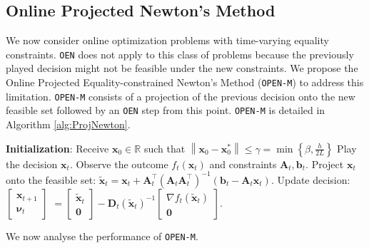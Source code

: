 \documentclass[journal,twoside,web]{ieeecolor}
\newcommand{\norm}[1]{\left\lVert#1\right\rVert}
\newcommand{\xx}{\mathbf{x}}
\newcommand{\bb}{\mathbf{b}}
\renewcommand{\AA}{\mathbf{A}}
\newcommand{\vv}{\bm{\nu}}
\newcommand{\yy}{\mathbf{y}}
\newcommand{\DD}{\mathbf{D}}
\begin{document}
\subsection{Online Projected Newton's Method}
We now consider online optimization problems with time-varying equality constraints. \texttt{OEN} does not apply to this class of problems because the previously played decision might not be feasible under the new constraints. We propose the Online Projected Equality-constrained Newton's Method (\texttt{OPEN-M}) to address this limitation. \texttt{OPEN-M} consists of a projection of the previous decision onto the new feasible set followed by an \texttt{OEN} step from this point. \texttt{OPEN-M} is detailed in Algorithm \ref{alg:ProjNewton}.
\begin{algorithm}
\caption{Online Projected Eq.-const. Newton Method}\label{alg:ProjNewton}
\begin{algorithmic}
\State\textbf{Initialization}: Receive $\xx_0 \in\mathbb{R}$ such that $\norm{\xx_0-\xx_0^*}\le\gamma=\min\left\{\beta,\frac{h}{2L}\right\}$
\State Play the decision $\xx_t.$
\State Observe the outcome $f_t(\xx_t)$ and constraints $\AA_t, \bb_t$.
\State Project $\xx_t$ onto the feasible set: 
\State $\tilde{\xx}_t = \xx_t+\AA_t^\top(\AA_t\AA_t^\top)^{-1}(\bb_t-\AA_t\xx_t).$
\State Update decision:
\State   $\begin{bmatrix}\xx_{t+1}\\ \vv_t\end{bmatrix}$ $=\begin{bmatrix}\tilde{\xx}_{t}\\ \mathbf{0}\end{bmatrix}-\DD_t(\tilde{\xx}_t)^{-1}\begin{bmatrix}\nabla f_t(\tilde{\xx}_t)\\\mathbf{0}\end{bmatrix}.$
\ENDFOR
\end{algorithmic}
\end{algorithm}
We now analyse the performance of \texttt{OPEN-M}.
\end{document}
